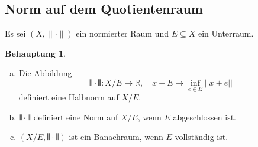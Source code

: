 \documentclass[ngerman]{article}
\theoremstyle{definition}%
\newtheorem*{beh}{Behauptung}
\newcommand{\R}{\mathbb{R}}
\newcommand{\norm}[1]{\left\lvert \left\lvert #1 \right\rvert \right\rvert}
\newcommand{\semi}[1]{\interleave{#1}\interleave}
\renewcommand{\{ }{\left\lbrace}
\renewcommand{\}}{\right\rbrace}
\begin{document}
\subsection{Norm auf dem Quotientenraum}
Es sei $(X, \|\cdot \|)$ ein normierter Raum und $E\subseteq X$ ein Unterraum.
\begin{beh}
	\begin{enumerate}[(a)]
	\item 	Die Abbildung
	$$ \semi{\cdot} : X/E \to \R,\quad x+E \mapsto \inf_{e\in E} \norm{x+e}$$
	definiert eine Halbnorm auf $X/E$.
	
	\item 	$\semi{\cdot}$ definiert eine Norm auf $X/E$, wenn $E$ abgeschlossen ist. 	
	
	\item $(X/E, \semi{\cdot})$ ist ein Banachraum, wenn $E$ vollständig ist.
	
	\end{enumerate}
\end{beh}
\end{document}
